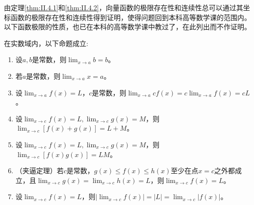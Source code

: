 \documentclass[main.tex]{subfiles}
\begin{document}
由定理\ref{thm:II.4.1}和\ref{thm:II.4.2}，向量函数的极限存在性和连续性总可以通过其坐标函数的极限存在性和连续性得到证明，使得问题回到本科高等数学课的范围内。以下函数极限的性质，也已在本科的高等数学课中教过了，在此列出而不作证明。
\begin{theorem}[函数极限的基本性质]\label{thm:II.4.4}
    在实数域内，以下命题成立:
    \begin{enumerate}
        \item 设$a,b$是常数，则$\lim_{x\to a}b=b$。
        \item 若$a$是常数，则$\lim_{x\to a} x=a$。
        \item 设$\lim_{x\to a}f\left(x\right)=L$，$c$是常数，则$\lim_{x\to a}cf\left(x\right)=c\lim_{x\to a}f\left(x\right)=cL$。
        \item 设$\lim_{x\to c}f\left(x\right)=L,\lim_{x\to c}g\left(x\right)=M$，则$\lim_{x\to c}\left[f\left(x\right)+g\left(x\right)\right]=L+M$。
        \item 设$\lim_{x\to c}f\left(x\right)=L,\lim_{x\to c}g\left(x\right)=M$，则$\lim_{x\to c}\left[f\left(x\right)g\left(x\right)\right]=LM$。
        \item （夹逼定理）若$c$是常数，$g\left(x\right)\leq f\left(x\right)\leq h\left(x\right)$至少在点$x=c$之外都成立，且$\lim_{x\to c}g\left(x\right)=\lim_{x\to c}h\left(x\right)=L$，则$\lim_{x\to c}f\left(x\right)=L$。
        \item 设$\lim_{x\to c}f\left(x\right)=L$，则$\left|\lim_{x\to c}f\left(x\right)\right|=\left|L\right|=\lim_{x\to c}\left|f\left(x\right)\right|$。
    \end{enumerate}
\end{theorem}
\end{document}
